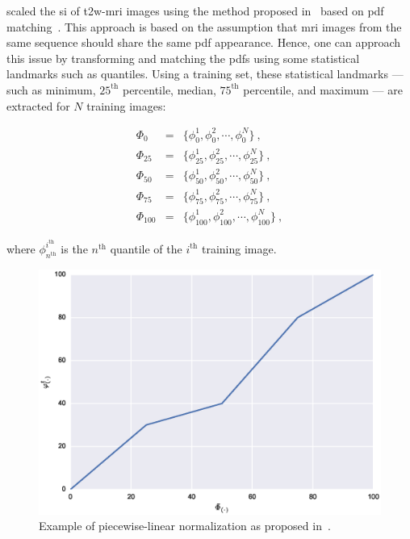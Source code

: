 \citeauthor{Lv2009} scaled the \ac{si} of \ac{t2w}-\ac{mri} images using the method proposed in~\cite{Nyul2000} based on \ac{pdf} matching~\cite{Lv2009}.
This approach is based on the assumption that \ac{mri} images from the same sequence should share the same \ac{pdf} appearance.
Hence, one can approach this issue by transforming and matching the \acp{pdf} using some statistical landmarks such as quantiles.
Using a training set, these statistical landmarks --- such as minimum, $25^{\text{th}}$ percentile, median, $75^{\text{th}}$ percentile, and maximum --- are extracted for $N$ training images:

\begin{eqnarray}	
	\Phi_{0} & = & \{ \phi_{0}^{1}, \phi_{0}^{2}, \cdots, \phi_{0}^{N} \} \ , \nonumber \\
	\Phi_{25} & = & \{ \phi_{25}^{1}, \phi_{25}^{2}, \cdots, \phi_{25}^{N} \} \ , \nonumber \\
	\Phi_{50} & = & \{ \phi_{50}^{1}, \phi_{50}^{2}, \cdots, \phi_{50}^{N} \} \ ,  \label{eq:quantileStd} \\
	\Phi_{75} & = & \{ \phi_{75}^{1}, \phi_{75}^{2}, \cdots, \phi_{75}^{N} \} \ , \nonumber \\
	\Phi_{100} & = & \{ \phi_{100}^{1}, \phi_{100}^{2}, \cdots, \phi_{100}^{N} \} \ , \nonumber
\end{eqnarray}

\noindent where $\phi_{n^\text{th}}^{i^{\text{th}}}$ is the $n^{\text{th}}$ quantile of the $i^{\text{th}}$ training image.

\begin{figure}
	\centering
	\includegraphics[width=0.7\linewidth]{3_review/figures/processing/pre-processing/normalization/linear_transform_parts.eps}
	\caption{Example of piecewise-linear normalization as proposed in~\cite{Nyul2000}.}
	\label{fig:imnorm}
\end{figure}

